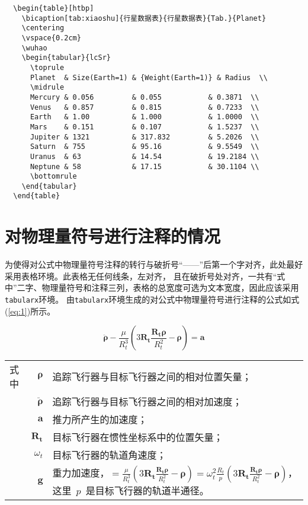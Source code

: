 \begin{lstlisting}
  \begin{table}[htbp]
    \bicaption[tab:xiaoshu]{行星数据表}{行星数据表}{Tab.}{Planet}
    \centering
    \vspace{0.2cm}
    \wuhao
    \begin{tabular}{lcSr}
      \toprule
      Planet  & Size(Earth=1) & {Weight(Earth=1)} & Radius  \\
      \midrule
      Mercury & 0.056         & 0.055           & 0.3871  \\
      Venus   & 0.857         & 0.815           & 0.7233  \\
      Earth   & 1.00          & 1.000           & 1.0000  \\
      Mars    & 0.151         & 0.107           & 1.5237  \\
      Jupiter & 1321          & 317.832         & 5.2026  \\
      Saturn  & 755           & 95.16           & 9.5549  \\
      Uranus  & 63            & 14.54           & 19.2184 \\
      Neptune & 58            & 17.15           & 30.1104 \\
      \bottomrule
    \end{tabular}
  \end{table}
\end{lstlisting}

\section{对物理量符号进行注释的情况}

为使得对公式中物理量符号注释的转行与破折号“——”后第一个字对齐，此处最好采用表格环境。此表格无任何线条，左对齐，
且在破折号处对齐，一共有“式中”二字、物理量符号和注释三列，表格的总宽度可选为文本宽度，因此应该采用\verb|tabularx|环境。
由\verb|tabularx|环境生成的对公式中物理量符号进行注释的公式如式(\ref{eq:1})所示。

\begin{equation}\label{eq:1}
\ddot{\boldsymbol{\rho}}-\frac{\mu}{R_{t}^{3}}\left(3\mathbf{R_{t}}\frac{\mathbf{R_{t}\rho}}{R_{t}^{2}}-\boldsymbol{\rho}\right)=\mathbf{a}
\end{equation}
\begin{tabularx}{\textwidth}{@{}l@{\quad}r@{——}X@{}}
式中& $\boldsymbol{\rho}$ &追踪飞行器与目标飞行器之间的相对位置矢量；\\
&  $\boldsymbol{\ddot{\rho}}$&追踪飞行器与目标飞行器之间的相对加速度；\\
&  $\mathbf{a}$   &推力所产生的加速度；\\
&  $\mathbf{R_t}$ & 目标飞行器在惯性坐标系中的位置矢量；\\
&  $\omega_{t}$ & 目标飞行器的轨道角速度；\\
&  $\mathbf{g}$ & 重力加速度，$=\frac{\mu}{R_{t}^{3}}\left(
3\mathbf{R_{t}}\frac{\mathbf{R_{t}\rho}}{R_{t}^{2}}-\boldsymbol{\rho}\right)=\omega_{t}^{2}\frac{R_{t}}{p}\left(
3\mathbf{R_{t}}\frac{\mathbf{R_{t}\rho}}{R_{t}^{2}}-\boldsymbol{\rho}\right)$，这里~$p$~是目标飞行器的轨道半通径。
\end{tabularx}
\vspace{2em}

